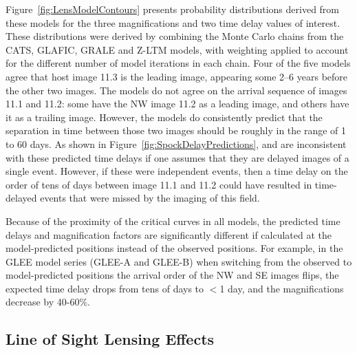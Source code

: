 Figure~\ref{fig:LensModelContours} presents probability distributions
derived from these models for the three magnifications and two time
delay values of interest.  These distributions were derived by
combining the Monte Carlo chains from the CATS, GLAFIC, GRALE and
Z-LTM models, with weighting applied to account for the different
number of model iterations in each chain. Four of the five models
agree that host image 11.3 is the leading image, appearing some 2--6
years before the other two images.  The models do not agree on the
arrival sequence of images 11.1 and 11.2: some have the NW image 11.2
as a leading image, and others have it as a trailing image.  However,
the models do consistently predict that the separation in time between
those two images should be roughly in the range of 1 to 60 days. As
shown in Figure~\ref{fig:SpockDelayPredictions}, \spockone and
\spocktwo are inconsistent with these predicted time delays if one
assumes that they are delayed images of a single event.  However, if
these were independent events, then a time delay on the order of tens of
days between image 11.1 and 11.2 could have resulted in time-delayed 
events that were missed by the \HST imaging of this field.


Because of the proximity of the critical curves in all models, the
predicted time delays and magnification factors are significantly
different if calculated at the model-predicted positions instead of
the observed positions.  For example, in the GLEE model series (GLEE-A
and GLEE-B) when switching from the observed to model-predicted
positions the arrival order of the NW and SE images flips, the
expected time delay drops from tens of days to $<$1 day, and the
magnifications decrease by 40-60\%.


\subsection{Line of Sight Lensing Effects}\label{sec:LineOfSightEffects}
 
